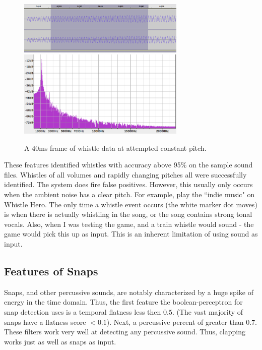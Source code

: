 \documentclass[DIV=calc, paper=a4, fontsize=11pt, twocolumn]{scrartcl}   %
\begin{document}
   \begin{figure}[h]
   \centering
   \includegraphics[width=80mm]{figures/whistle_frame_t.png}
   \includegraphics[width=80mm]{figures/whistle_frame_f.png}
   \caption{A 40ms frame of whistle data at attempted constant pitch.}
   \label{overflow}
   \end{figure}
   \par
   These features identified whistles with accuracy above 95\% on the sample sound files. Whistles of all volumes and rapidly changing pitches all were successfully identified. The system does fire false positives. However, this usually only occurs when the ambient noise has a clear pitch. For example, play the ``indie music" on Whistle Hero. The only time a whistle event occurs (the white marker dot moves) is when there is actually whistling in the song, or the song contains strong tonal vocals. Also, when I was testing the game, and a train whistle would sound - the game would pick this up as input. This is an inherent limitation of using sound as input.

   \subsection{Features of Snaps}

   Snaps, and other percussive sounds, are notably characterized by a huge spike of energy in the time domain. Thus, the first feature the boolean-perceptron for snap detection uses is a temporal flatness less then $0.5$. (The vast majority of snaps have a flatness score $<0.1$). Next, a percussive percent of greater than $0.7$. These filters work very well at detecting any percussive sound. Thus, clapping works just as well as snaps as input.
\end{document}
